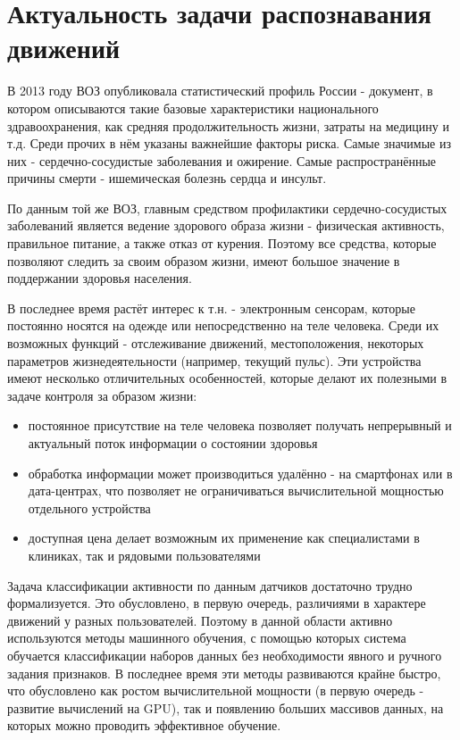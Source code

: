 \chapter{Актуальность задачи распознавания движений}

В 2013 году ВОЗ опубликовала статистический профиль России - документ, в котором описываются такие базовые характеристики национального здравоохранения, как средняя продолжительность жизни, затраты на медицину и т.д\cite{who_russia_profile}. Среди прочих в нём указаны важнейшие факторы риска. Самые значимые из них - сердечно-сосудистые заболевания и ожирение. Самые распространённые причины смерти - ишемическая болезнь сердца и инсульт. 

По данным той же ВОЗ\cite{who_cardiovascular}, главным средством профилактики сердечно-сосудистых заболеваний является ведение здорового образа жизни - физическая активность, правильное питание, а также отказ от курения. Поэтому все средства, которые позволяют следить за своим образом жизни, имеют большое значение в поддержании здоровья населения.

В последнее время растёт интерес к т.н.  - электронным сенсорам, которые постоянно носятся на одежде или непосредственно на теле человека. Среди их возможных функций - отслеживание движений, местоположения, некоторых параметров жизнедеятельности (например, текущий пульс). Эти устройства имеют несколько отличительных особенностей, которые делают их полезными в задаче контроля за образом жизни:
\begin{itemize}
\item постоянное присутствие на теле человека позволяет получать непрерывный и актуальный поток информации о состоянии здоровья
\item обработка информации может производиться удалённо - на смартфонах или в дата-центрах, что позволяет не ограничиваться вычислительной мощностью отдельного устройства
\item доступная цена делает возможным их применение как специалистами в клиниках, так и рядовыми пользователями
\end{itemize}

Задача классификации активности по данным датчиков достаточно трудно формализуется. Это обусловлено, в первую очередь, различиями в характере движений у разных пользователей. Поэтому в данной области активно используются методы машинного обучения, с помощью которых система обучается классификации наборов данных без необходимости явного и ручного задания признаков. В последнее время эти методы развиваются крайне быстро, что обусловлено как ростом вычислительной мощности (в первую очередь - развитие вычислений на GPU), так и появлению больших массивов данных, на которых можно проводить эффективное обучение.

